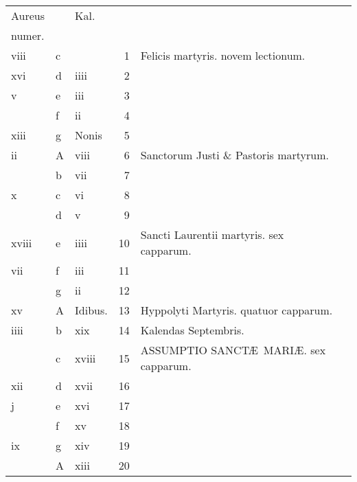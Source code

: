 \documentclass[openany]{book}
\begin{document}
\begin{center}
\begin{tabular}{l | l | l | r | l r}
\color{Red}Aureus & & \color{Red} Kal. & & \color{Red} \\
\color{Red}numer. & & & & \color{Red} \\
\color{Red} viii & c & & 1 & Felicis martyris. \color{Red} novem lectionum. & \color{Red} \\
\color{Red} xvi & d & \color{Red} iiii & 2 & & \color{Red} \\
\color{Red} v & e & \color{Red} iii & 3 & & \color{Red} \\
\color{Red}  & f & \color{Red} ii & 4 & & \color{Red} \\
\color{Red} xiii & g & Nonis & 5 & & \color{Red} \\
\color{Red} ii & \color{Red} A & \color{Red} viii & 6 & Sanctorum Justi \& Pastoris martyrum. & \color{Red} \\
\color{Red}  & b & \color{Red} vii & 7 & & \color{Red} \\
\color{Red} x & c & \color{Red} vi & 8 & & \color{Red} \\
\color{Red}  & d & \color{Red} v & 9 & & \color{Red} \\
\color{Red} xviii & e & \color{Red} iiii & 10 & \color{Red} Sancti Laurentii martyris. \color{black} sex capparum. & \color{Red} \\
\color{Red} vii & f & \color{Red} iii & 11 & & \color{Red} \\
\color{Red}  & g & \color{Red} ii & 12 & & \color{Red} \\
\color{Red} xv & \color{Red} A & Idibus. & 13 & Hyppolyti Martyris. \color{Red} quatuor capparum. & \color{Red} \\
\color{Red} iiii & b & \color{Red} xix & 14 & \qquad \color{Red} Kalendas Septembris. & \color{Red} \\
\color{Red}  & c & \color{Red} xviii & 15 & \color{Red} ASSUMPTIO SANCT\AE \ MARI\AE . \color{black} sex capparum. & \color{Red} \\
\color{Red} xii & d & \color{Red} xvii & 16 & & \color{Red} \\
\color{Red} j & e & \color{Red} xvi & 17 & & \color{Red} \\
\color{Red}  & f & \color{Red} xv & 18 & & \color{Red} \\
\color{Red} ix & g & \color{Red} xiv & 19 & & \color{Red} \\
\color{Red}  & \color{Red} A & \color{Red} xiii & 20 & & \color{Red} \\

\end{tabular}
\end{center}
\end{document}
